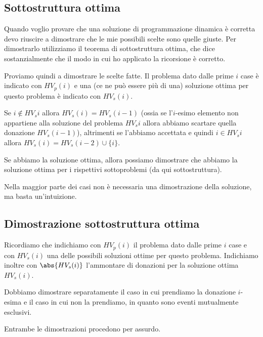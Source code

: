 \subsection*{Sottostruttura ottima}

Quando voglio provare che una soluzione di programmazione dinamica è corretta devo riuscire a dimostrare che le mie possibili scelte sono quelle giuste.
Per dimostrarlo utilizziamo il teorema di sottostruttura ottima, che dice sostanzialmente che il modo in cui ho applicato la ricorsione è corretto.

Proviamo quindi a dimostrare le scelte fatte.
Il problema dato dalle prime \(i\) case è indicato con \(HV_{p}(i)\) e una (ce ne può essere più di una) soluzione ottima per questo problema è indicato con \(HV_{s}(i)\).

Se \(i \not\in HV_{s}i\) allora \(HV_{s}(i) = HV_{s}(i-1)\) (ossia se l'\(i\)-esimo elemento non appartiene alla soluzione del problema \(HV_{s}i\) allora abbiamo scartare quella donazione \(HV_{s}(i-1)\)), altrimenti se l'abbiamo accettata e quindi \(i \in HV_{s}i\) allora \(HV_{s}(i) = HV_{s}(i-2) \cup \{i\}\).

Se abbiamo la soluzione ottima, allora possiamo dimostrare che abbiamo la soluzione ottima per i rispettivi sottoproblemi (da qui sottostruttura).

\begin{note}
Nella maggior parte dei casi non è necessaria una dimostrazione della soluzione, ma basta un'intuizione.
\end{note}

\subsection{Dimostrazione sottostruttura ottima}

Ricordiamo che indichiamo con \(HV_{p}(i)\) il problema dato dalle prime \(i\) case e con \(HV_{s}(i)\) una delle possibili soluzioni ottime per questo problema.
Indichiamo inoltre con \(\abs{HV_{s}(i)}\) l'ammontare di donazioni per la soluzione ottima \(HV_{s}(i)\).

\begin{note}
Dobbiamo dimostrare separatamente il caso in cui prendiamo la donazione \(i\)-esima e il caso in cui non la prendiamo, in quanto sono eventi mutualmente esclusivi.
\end{note}

Entrambe le dimostrazioni procedono per assurdo.

